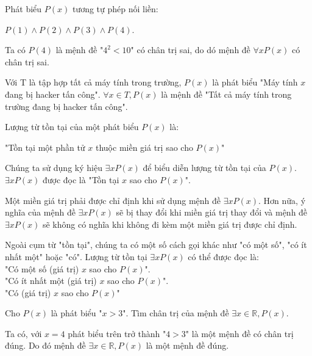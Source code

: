 \documentclass{standalone} %
\begin{document}
        Phát biểu $P(x)$ tương tự phép nối liền:
        \begin{center}
            $P(1) \land P(2) \land P(3) \land P(4)$.
        \end{center}
        Ta có $P(4)$ là mệnh đề "$4^2 < 10$" có chân trị sai, do dó mệnh đề $\forall x P(x)$ có chân trị sai.
        
        \begin{example}
            Với T là tập hợp tất cả máy tính trong trường, $P(x)$ là phát biểu "Máy tính $x$ đang bị hacker tấn công". $\forall x \in T, P(x)$ là mệnh đề "Tất cả máy tính trong trường đang bị hacker tấn công".
        \end{example}
        
        \begin{definition}
            Lượng từ tồn tại của một phát biểu $P(x)$ là:
            \begin{center}
                "Tồn tại một phần tử $x$ thuộc miền giá trị sao cho $P(x)$"
            \end{center}
            Chúng ta sử dụng ký hiệu $\exists x P(x)$ để biểu diễn lượng từ tồn tại của $P(x)$. $\exists x P(x)$ được đọc là "Tồn tại $x$ sao cho $P(x)$".
        \end{definition}
        
        Một miền giá trị phải được chỉ định khi sử dụng mệnh đề $\exists x P(x)$. Hơn nữa, ý nghĩa của mệnh đề $\exists x P(x)$ sẽ bị thay đổi khi miền giá trị thay đổi và mệnh đề $\exists x P(x)$ sẽ không có nghĩa khi không đi kèm một miền giá trị được chỉ định.
        
        Ngoài cụm từ "tồn tại", chúng ta có một số cách gọi khác như "có một số", "có ít nhất một" hoặc "có". Lượng từ tồn tại $\exists x P(x)$ có thể được đọc là:\\
        "Có một số (giá trị) $x$ sao cho $P(x)$".\\
        "Có ít nhất một (giá trị) $x$ sao cho $P(x)$".\\
        "Có (giá trị) $x$ sao cho $P(x)$"
        
        \begin{example}
            Cho $P(x)$ là phát biểu "$x > 3$". Tìm chân trị của mệnh đề $\exists x \in \mathbb{R}, P(x)$.
        \end{example}
        
        Ta có, với $x = 4$ phát biểu trên trở thành "$4 > 3$" là một mệnh đề có chân trị đúng. Do đó mệnh đề $\exists x \in \mathbb{R}, P(x)$ là một mệnh đề đúng.
        
\end{document}
